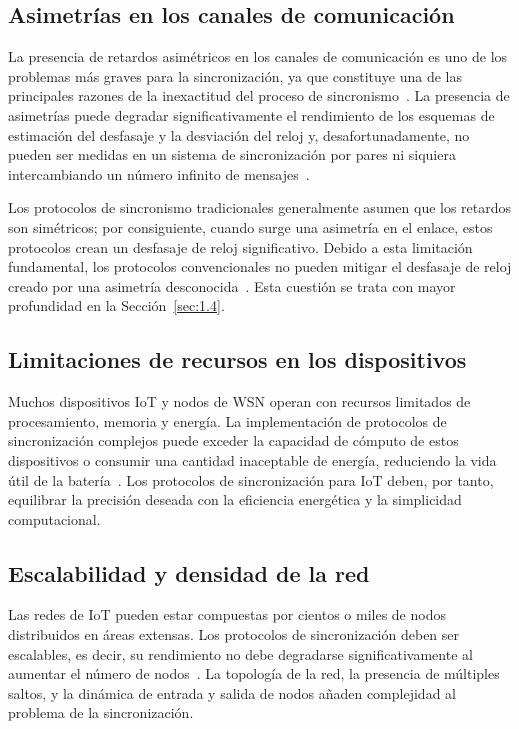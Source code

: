 \subsection{Asimetrías en los canales de comunicación}
\label{sec:1.3.3}

La presencia de retardos asimétricos en los canales de comunicación es uno de los problemas más graves para la sincronización, ya que constituye una de las principales razones de la inexactitud del proceso de sincronismo~\cite{freris2011}. La presencia de asimetrías puede degradar significativamente el rendimiento de los esquemas de estimación del desfasaje y la desviación del reloj y, desafortunadamente, no pueden ser medidas en un sistema de sincronización por pares ni siquiera intercambiando un número infinito de mensajes~\cite{levesque2015}.

Los protocolos de sincronismo tradicionales generalmente asumen que los retardos son simétricos; por consiguiente, cuando surge una asimetría en el enlace, estos protocolos crean un desfasaje de reloj significativo. Debido a esta limitación fundamental, los protocolos convencionales no pueden mitigar el desfasaje de reloj creado por una asimetría desconocida~\cite{exel2014,oliva2024}. Esta cuestión se trata con mayor profundidad en la Sección~\ref{sec:1.4}.

\subsection{Limitaciones de recursos en los dispositivos}
\label{sec:1.3.4}

Muchos dispositivos IoT y nodos de WSN operan con recursos limitados de procesamiento, memoria y energía. La implementación de protocolos de sincronización complejos puede exceder la capacidad de cómputo de estos dispositivos o consumir una cantidad inaceptable de energía, reduciendo la vida útil de la batería~\cite{lasassmeh2010}. Los protocolos de sincronización para IoT deben, por tanto, equilibrar la precisión deseada con la eficiencia energética y la simplicidad computacional.

\subsection{Escalabilidad y densidad de la red}
\label{sec:1.3.5}

Las redes de IoT pueden estar compuestas por cientos o miles de nodos distribuidos en áreas extensas. Los protocolos de sincronización deben ser escalables, es decir, su rendimiento no debe degradarse significativamente al aumentar el número de nodos~\cite{swain2015}. La topología de la red, la presencia de múltiples saltos, y la dinámica de entrada y salida de nodos añaden complejidad al problema de la sincronización.

